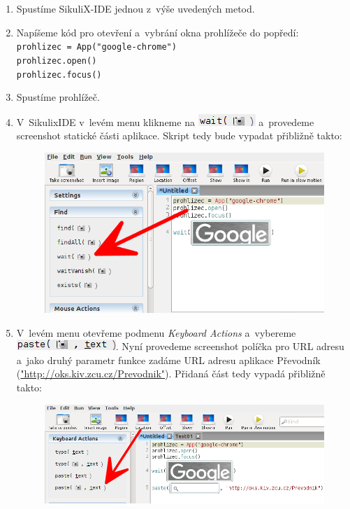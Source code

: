 			\begin{enumerate}
				\item Spustíme SikuliX-IDE jednou z~výše uvedených metod.
				\item Napíšeme kód pro otevření a~vybrání okna prohlížeče do popředí:\\\texttt{prohlizec = App("google-chrome")\\prohlizec.open()\\prohlizec.focus()}
				\item Spustíme prohlížeč.
				\item V~SikulixIDE v~levém menu klikneme na \includegraphics[scale=0.7]{img/PrvniSkript/wait.png} a~provedeme screenshot statické části aplikace. Skript tedy bude vypadat přibližně takto:
					\begin{figure}[ht!]
						\centering
						\includegraphics[width=12.5cm]{img/PrvniSkript/krok4.png}
					\end{figure}
					\FloatBarrier
				\item V~levém menu otevřeme podmenu \emph{Keyboard Actions} a~vybereme\\\includegraphics[scale=0.7]{img/PrvniSkript/paste.png}. Nyní provedeme screenshot políčka pro URL adresu a~jako druhý parametr funkce zadáme URL adresu aplikace Převodník (\url{"http://oks.kiv.zcu.cz/Prevodnik"}). Přidaná část tedy vypadá přibližně takto:
					\begin{figure}[ht!]
						\centering
						\includegraphics[width=12.5cm]{img/PrvniSkript/krok5.png}

\end{figure}
\end{enumerate}
